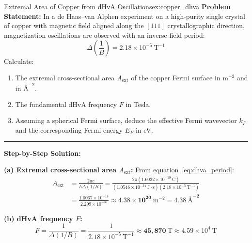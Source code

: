 \documentclass[11pt,a4paper]{article}
\begin{document}
\begin{examplebox}{Extremal Area of Copper from dHvA Oscillations}{ex:copper_dhva}
\textbf{Problem Statement:}
In a de Haas--van Alphen experiment on a high-purity single crystal of copper with magnetic field aligned along the $[111]$ crystallographic direction, magnetization oscillations are observed with an inverse field period:
\[
\Delta\left(\frac{1}{B}\right) = 2.18 \times 10^{-5}\ \mathrm{T}^{-1}
\]
Calculate:
\begin{enumerate}[label=(\alph*)]
    \item The extremal cross-sectional area $A_{\mathrm{ext}}$ of the copper Fermi surface in $\mathrm{m}^{-2}$ and in $\text{\AA}^{-2}$.
    \item The fundamental dHvA frequency $F$ in Tesla.
    \item Assuming a spherical Fermi surface, deduce the effective Fermi wavevector $k_F$ and the corresponding Fermi energy $E_F$ in eV.
\end{enumerate}

\vspace{0.2cm}\hrule\vspace{0.2cm}
\textbf{Step-by-Step Solution:}

\textbf{(a) Extremal cross-sectional area $A_{\mathrm{ext}}$:}
From equation~\eqref{eq:dhva_period}:
\begin{align*}
A_{\mathrm{ext}} &= \frac{2\pi e}{\hbar \Delta(1/B)} = \frac{2\pi(1.6022 \times 10^{-19}\ \mathrm{C})}{(1.0546 \times 10^{-34}\ \mathrm{J\cdot s})(2.18 \times 10^{-5}\ \mathrm{T^{-1}})} \\
&= \frac{1.0067 \times 10^{-18}}{2.299 \times 10^{-39}} \approx \mathbf{4.38 \times 10^{20}\ \mathrm{m^{-2}}} = \mathbf{4.38\ \text{\AA}^{-2}}
\end{align*}

\textbf{(b) dHvA frequency $F$:}
\[
F = \frac{1}{\Delta(1/B)} = \frac{1}{2.18 \times 10^{-5}\ \mathrm{T^{-1}}} \approx \mathbf{45{,}870\ \mathrm{T}} \approx 4.59 \times 10^4\ \mathrm{T}
\]


\end{examplebox}
\end{document}
